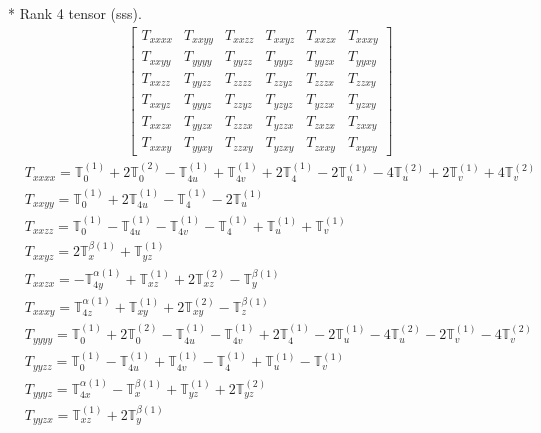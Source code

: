 \documentclass[fleqn,8pt,landscape]{jsarticle}
\begin{document}
* Rank 4 tensor (sss).
\begin{align*}
\begin{bmatrix} T_{xxxx} & T_{xxyy} & T_{xxzz} & T_{xxyz} & T_{xxzx} & T_{xxxy} \\ T_{xxyy} & T_{yyyy} & T_{yyzz} & T_{yyyz} & T_{yyzx} & T_{yyxy} \\ T_{xxzz} & T_{yyzz} & T_{zzzz} & T_{zzyz} & T_{zzzx} & T_{zzxy} \\ T_{xxyz} & T_{yyyz} & T_{zzyz} & T_{yzyz} & T_{yzzx} & T_{yzxy} \\ T_{xxzx} & T_{yyzx} & T_{zzzx} & T_{yzzx} & T_{zxzx} & T_{zxxy} \\ T_{xxxy} & T_{yyxy} & T_{zzxy} & T_{yzxy} & T_{zxxy} & T_{xyxy} \end{bmatrix}
\end{align*}
\begin{align*}
& T_{xxxx} = \mathbb{T}_{0}^{(1)} + 2 \mathbb{T}_{0}^{(2)} - \mathbb{T}_{4u}^{(1)} + \mathbb{T}_{4v}^{(1)} + 2 \mathbb{T}_{4}^{(1)} - 2 \mathbb{T}_{u}^{(1)} - 4 \mathbb{T}_{u}^{(2)} + 2 \mathbb{T}_{v}^{(1)} + 4 \mathbb{T}_{v}^{(2)} \\
& T_{xxyy} = \mathbb{T}_{0}^{(1)} + 2 \mathbb{T}_{4u}^{(1)} - \mathbb{T}_{4}^{(1)} - 2 \mathbb{T}_{u}^{(1)} \\
& T_{xxzz} = \mathbb{T}_{0}^{(1)} - \mathbb{T}_{4u}^{(1)} - \mathbb{T}_{4v}^{(1)} - \mathbb{T}_{4}^{(1)} + \mathbb{T}_{u}^{(1)} + \mathbb{T}_{v}^{(1)} \\
& T_{xxyz} = 2 \mathbb{T}_{x}^{\beta(1)} + \mathbb{T}_{yz}^{(1)} \\
& T_{xxzx} = - \mathbb{T}_{4y}^{\alpha(1)} + \mathbb{T}_{xz}^{(1)} + 2 \mathbb{T}_{xz}^{(2)} - \mathbb{T}_{y}^{\beta(1)} \\
& T_{xxxy} = \mathbb{T}_{4z}^{\alpha(1)} + \mathbb{T}_{xy}^{(1)} + 2 \mathbb{T}_{xy}^{(2)} - \mathbb{T}_{z}^{\beta(1)} \\
& T_{yyyy} = \mathbb{T}_{0}^{(1)} + 2 \mathbb{T}_{0}^{(2)} - \mathbb{T}_{4u}^{(1)} - \mathbb{T}_{4v}^{(1)} + 2 \mathbb{T}_{4}^{(1)} - 2 \mathbb{T}_{u}^{(1)} - 4 \mathbb{T}_{u}^{(2)} - 2 \mathbb{T}_{v}^{(1)} - 4 \mathbb{T}_{v}^{(2)} \\
& T_{yyzz} = \mathbb{T}_{0}^{(1)} - \mathbb{T}_{4u}^{(1)} + \mathbb{T}_{4v}^{(1)} - \mathbb{T}_{4}^{(1)} + \mathbb{T}_{u}^{(1)} - \mathbb{T}_{v}^{(1)} \\
& T_{yyyz} = \mathbb{T}_{4x}^{\alpha(1)} - \mathbb{T}_{x}^{\beta(1)} + \mathbb{T}_{yz}^{(1)} + 2 \mathbb{T}_{yz}^{(2)} \\
& T_{yyzx} = \mathbb{T}_{xz}^{(1)} + 2 \mathbb{T}_{y}^{\beta(1)} \\

\end{align*}
\end{document}

